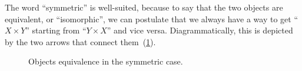 The word ``symmetric'' is well-suited, because to say that the two objects are equivalent, or ``isomorphic'', we can postulate that we always have a way to get
``$X \times Y$'' starting from ``$Y \times X$'' and vice versa.
Diagrammatically, this is depicted by the two arrows that connect them~(\cref{fig:e17}).

\begin{figure}[h!]
    \centering
    \caption{Objects equivalence in the symmetric case. }
    \label{fig:e17}
\end{figure}


